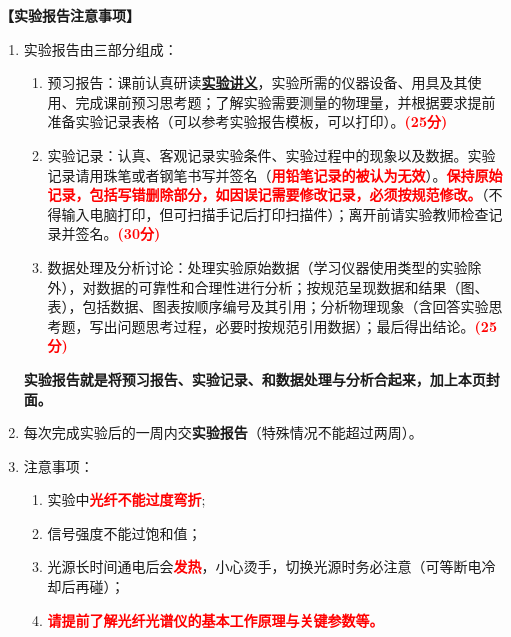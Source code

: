 \documentclass[dvipsnames, svgnames,a4paper,11pt]{article}
\begin{document}
\textbf{【实验报告注意事项】}
\begin{enumerate}
	\item 实验报告由三部分组成：
	\begin{enumerate}[label=\textup{(\arabic*)}]
		\item 预习报告：课前认真研读\underline{\textbf{实验讲义}}，实验所需的仪器设备、用具及其使用、完成课前预习思考题；了解实验需要测量的物理量，并根据要求提前准备实验记录表格（可以参考实验报告模板，可以打印）。\textcolor{red}{\textbf{(25分)}}
		
	    \item 实验记录：认真、客观记录实验条件、实验过程中的现象以及数据。实验记录请用珠笔或者钢笔书写并签名（\textcolor{red}{\textbf{用铅笔记录的被认为无效}}）。\textcolor{red}{\textbf{保持原始记录，包括写错删除部分，如因误记需要修改记录，必须按规范修改。}}（不得输入电脑打印，但可扫描手记后打印扫描件）；离开前请实验教师检查记录并签名。\textcolor{red}{\textbf{(30分)}}
	    
	    \item 数据处理及分析讨论：处理实验原始数据（学习仪器使用类型的实验除外），对数据的可靠性和合理性进行分析；按规范呈现数据和结果（图、表），包括数据、图表按顺序编号及其引用；分析物理现象（含回答实验思考题，写出问题思考过程，必要时按规范引用数据）；最后得出结论。\textcolor{red}{\textbf{(25分)}}
	    
	\end{enumerate}
	\textbf{实验报告就是将预习报告、实验记录、和数据处理与分析合起来，加上本页封面。}
	\item 每次完成实验后的一周内交\textbf{实验报告}（特殊情况不能超过两周）。
	\item 注意事项：
		\begin{enumerate}[label=\textup{(\arabic*)}]
			\item 实验中\textcolor{red}{\textbf{光纤不能过度弯折}};
			\item 信号强度不能过饱和值；
			\item 光源长时间通电后会\textcolor{red}{\textbf{发热}}，小心烫手，切换光源时务必注意（可等断电冷却后再碰）；
			\item \textcolor{red}{\textbf{请提前了解光纤光谱仪的基本工作原理与关键参数等。}}
		
		

		\end{enumerate}
\end{enumerate}



\clearpage
\tableofcontents
\clearpage
\end{document}
